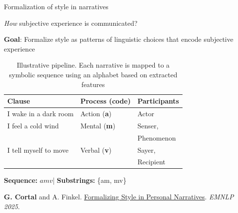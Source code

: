 \documentclass[handout,10pt]{beamer}
\begin{document}
\begin{frame}{Formalization of style in narratives}

\textit{How} subjective experience is communicated?

\vspace{0.5cm}
\pause

\textbf{Goal}: Formalize style as patterns of linguistic choices that encode subjective experience

\pause
\vspace{0.5cm}

\begin{table}[!ht]
  \centering
  \small
  \renewcommand{\arraystretch}{1.1}
  \begin{threeparttable}
  
    \begin{tabular}{l|l|l}
      \textbf{Clause} & \textbf{Process (code)} & \textbf{Participants} \\
      \midrule
      I wake in a dark room         & Action (\textbf{a})  & Actor \\
      I feel a cold wind            & Mental (\textbf{m})  & Senser,\\
                                            &             & Phenomenon \\
      I tell myself to move         & Verbal (\textbf{v})  & Sayer,\\
                                            &             & Recipient \\
      \bottomrule
    \end{tabular}

    \begin{tablenotes}[flushleft]
      \footnotesize
      \item \textbf{Sequence:} $amv$\quad|\quad
            \textbf{Substrings:} \{am, mv\}
    \end{tablenotes}
  \end{threeparttable}
  \caption{Illustrative pipeline. Each narrative is mapped to a symbolic sequence using an alphabet based on extracted features}
    \label{tab:example}
\end{table}

\scriptsize

\textbf{G. Cortal} and A. Finkel. \href{https://gustavecortal.com/data/Formalizing_Style_in_Personal_Narratives.pdf}{Formalizing Style in Personal Narratives}. \textit{EMNLP 2025}.
    
\end{frame}
\end{document}
